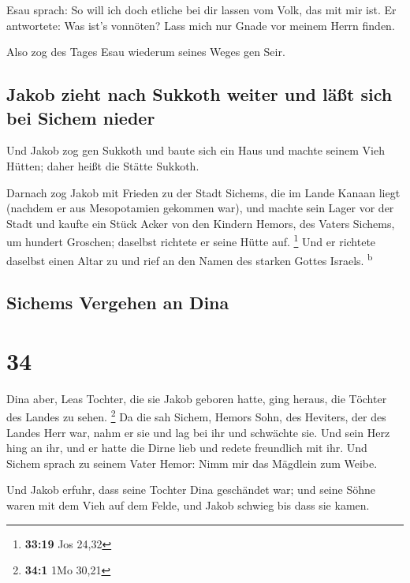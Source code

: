  Esau sprach: So will ich doch etliche bei dir lassen vom
Volk, das mit mir ist. Er antwortete: Was ist's vonnöten? Lass mich nur
Gnade vor meinem Herrn finden.

 Also zog des Tages Esau wiederum seines Weges gen Seir.

\hypertarget{jakob-zieht-nach-sukkoth-weiter-und-luxe4uxdft-sich-bei-sichem-nieder}{%
\subsection{Jakob zieht nach Sukkoth weiter und läßt sich bei Sichem
nieder}\label{jakob-zieht-nach-sukkoth-weiter-und-luxe4uxdft-sich-bei-sichem-nieder}}

 Und Jakob zog gen Sukkoth und baute sich ein Haus und
machte seinem Vieh Hütten; daher heißt die Stätte Sukkoth.

 Darnach zog Jakob mit Frieden zu der Stadt Sichems, die
im Lande Kanaan liegt (nachdem er aus Mesopotamien gekommen war), und
machte sein Lager vor der Stadt  und kaufte ein Stück
Acker von den Kindern Hemors, des Vaters Sichems, um hundert Groschen;
daselbst richtete er seine Hütte auf. \footnote{\textbf{33:19} Jos 24,32}
 Und er richtete daselbst einen Altar zu und rief an den
Namen des starken Gottes Israels. \textsuperscript{b}

\hypertarget{sichems-vergehen-an-dina}{%
\subsection{Sichems Vergehen an Dina}\label{sichems-vergehen-an-dina}}

\hypertarget{section-33}{%
\section{34}\label{section-33}}

 Dina aber, Leas Tochter, die sie Jakob geboren hatte,
ging heraus, die Töchter des Landes zu sehen. \footnote{\textbf{34:1}
  1Mo 30,21}  Da die sah Sichem, Hemors Sohn, des
Heviters, der des Landes Herr war, nahm er sie und lag bei ihr und
schwächte sie.  Und sein Herz hing an ihr, und er hatte
die Dirne lieb und redete freundlich mit ihr.  Und Sichem
sprach zu seinem Vater Hemor: Nimm mir das Mägdlein zum Weibe.

 Und Jakob erfuhr, dass seine Tochter Dina geschändet war;
und seine Söhne waren mit dem Vieh auf dem Felde, und Jakob schwieg bis
dass sie kamen.


